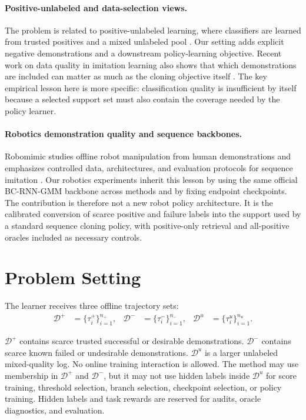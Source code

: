\documentclass[11pt]{article}
\newcommand{\Dpos}{\mathcal{D}^{+}}
\newcommand{\Dneg}{\mathcal{D}^{-}}
\newcommand{\Dunl}{\mathcal{D}^{u}}
\begin{document}
\paragraph{Positive-unlabeled and data-selection views.}
The problem is related to positive-unlabeled learning, where classifiers are learned from trusted positives and a mixed unlabeled pool \cite{elkan2008positive}. Our setting adds explicit negative demonstrations and a downstream policy-learning objective. Recent work on data quality in imitation learning also shows that which demonstrations are included can matter as much as the cloning objective itself \cite{belkhale2023dataquality}. The key empirical lesson here is more specific: classification quality is insufficient by itself because a selected support set must also contain the coverage needed by the policy learner.

\paragraph{Robotics demonstration quality and sequence backbones.}
Robomimic studies offline robot manipulation from human demonstrations and emphasizes controlled data, architectures, and evaluation protocols for sequence imitation \cite{mandlekar2021robomimic}. Our robotics experiments inherit this lesson by using the same official BC-RNN-GMM backbone across methods and by fixing endpoint checkpoints. The contribution is therefore not a new robot policy architecture. It is the calibrated conversion of scarce positive and failure labels into the support used by a standard sequence cloning policy, with positive-only retrieval and all-positive oracles included as necessary controls.

\section{Problem Setting}

The learner receives three offline trajectory sets:
\begin{align}
  \Dpos &= \{\tau_i^+\}_{i=1}^{n_+}, &
  \Dneg &= \{\tau_i^-\}_{i=1}^{n_-}, &
  \Dunl &= \{\tau_i^u\}_{i=1}^{n_u}.
\end{align}

\noindent $\Dpos$ contains scarce trusted successful or desirable demonstrations. $\Dneg$ contains scarce known failed or undesirable demonstrations. $\Dunl$ is a larger unlabeled mixed-quality log. No online training interaction is allowed. The method may use membership in $\Dpos$ and $\Dneg$, but it may not use hidden labels inside $\Dunl$ for score training, threshold selection, branch selection, checkpoint selection, or policy training. Hidden labels and task rewards are reserved for audits, oracle diagnostics, and evaluation.
\end{document}
